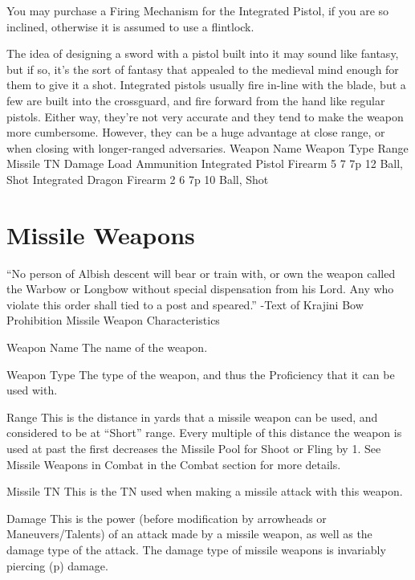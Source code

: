 \documentclass[oneside,11pt,english]{book}
\begin{document}
You may purchase a Firing Mechanism for the Integrated Pistol, if you are so inclined, otherwise it is assumed to use a flintlock.

The idea of designing a sword with a pistol built into it may sound like fantasy, but if so, it’s the sort of fantasy that appealed to the medieval mind enough for them to give it a shot. Integrated pistols usually fire in-line with the blade, but a few are built into the crossguard, and fire forward from the hand like regular pistols. Either way, they’re not very accurate and they tend to make the weapon more cumbersome. However, they can be a huge advantage at close range, or when closing with longer-ranged adversaries.
Weapon Name Weapon Type Range Missile TN Damage Load Ammunition
Integrated Pistol Firearm 5 7 7p 12 Ball, Shot
Integrated Dragon Firearm 2 6 7p 10 Ball, Shot

\chapter{Missile Weapons}
“No person of Albish descent will bear or train with, or own the weapon called the Warbow or Longbow 
without special dispensation from his Lord. Any who violate this order shall tied to a post and speared.” 
-Text of Krajini Bow Prohibition 
Missile Weapon Characteristics 


Weapon Name 
The name of the weapon. 

 

Weapon Type 
The type of the weapon, and thus the Proficiency that it can be used with. 

 

Range 
This is the distance in yards that a missile weapon can be used, and considered to be at “Short” range. 
Every multiple of this distance the weapon is used at past the first decreases the Missile Pool for Shoot or 
Fling by 1. See Missile Weapons in Combat in the Combat section for more details. 


 

Missile TN 
This is the TN used when making a missile attack with this weapon. 

 

Damage 
This is the power (before modification by arrowheads or Maneuvers/Talents) of an attack made by a 
missile weapon, as well as the damage type of the attack. The damage type of missile weapons is 
invariably piercing (p) damage. 

 
\end{document}
